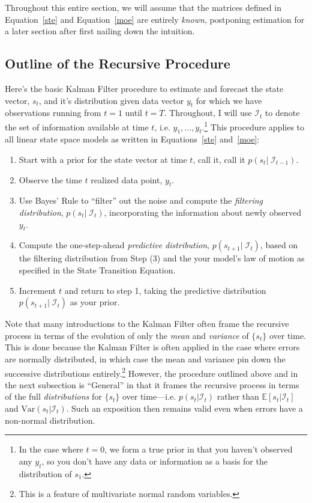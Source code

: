 \documentclass[a4paper,12pt]{article}
\begin{document}
Throughout this entire section, we will assume that the matrices defined
in Equation~\ref{ste} and Equation~\ref{moe} are entirely \emph{known},
postponing estimation for a later section after first nailing down the
intuition.

\subsection{Outline of the Recursive Procedure}
\label{subsec:kfoutline}

Here's the basic Kalman Filter procedure to estimate and forecast the
state vector, $s_t$, and it's distribution given data vector $y_t$ for
which we have observations running from $t=1$ until $t=T$. Throughout, I
will use $\mathcal{I}_{t}$ to denote the set of information available at
time $t$, i.e. $y_1, \ldots, y_{t}$.\footnote{In the case where $t=0$,
we form a true prior in that you haven't observed any $y_t$, so you
don't have any data or information as a basis for the distribution of
$s_1$.} This procedure applies to all linear state space models as
written in Equations~\ref{ste} and~\ref{moe}:
\begin{enumerate}
\item Start with a prior for the state vector at time $t$, call it, call
  it $p(s_t |\; \mathcal{I}_{t-1})$.

\item Observe the time $t$ realized data point, $y_t$.

\item Use Bayes' Rule to ``filter'' out the noise and compute the
  \emph{filtering distribution}, $p(s_t |\; \mathcal{I}_{t})$,
  incorporating the information about newly observed $y_t$.

\item Compute the one-step-ahead \emph{predictive distribution},
  $p(s_{t+1} | \; \mathcal{I}_{t})$, based on the filtering distribution
  from Step (3) and the your model's law of motion as specified in the
  State Transition Equation.

\item Increment $t$ and return to step 1, taking the predictive
  distribution $p(s_{t+1} |\; \mathcal{I}_{t})$ as your prior.
\end{enumerate}
Note that many introductions to the Kalman Filter often frame the
recursive process in terms of the evolution of only the \emph{mean} and
\emph{variance} of $\{s_t\}$ over time. This is done because the Kalman
Filter is often applied in the case where errors are normally
distributed, in which case the mean and variance pin down the successive
distributions {entirely}.\footnote{This is a feature of multivariate
normal random variables.} However, the procedure outlined above and in
the next subsection is ``General'' in that it frames the recursive
process in terms of the full \emph{distributions} for $\{s_t\}$ over
time---i.e. $p(s_t|\mathcal{I}_t)$ rather than
$\mathbb{E}[s_t|\mathcal{I}_t]$ and $\text{Var}(s_t|\mathcal{I}_t)$.
Such an exposition then remains valid even when errors have a non-normal
distribution.
\end{document}
